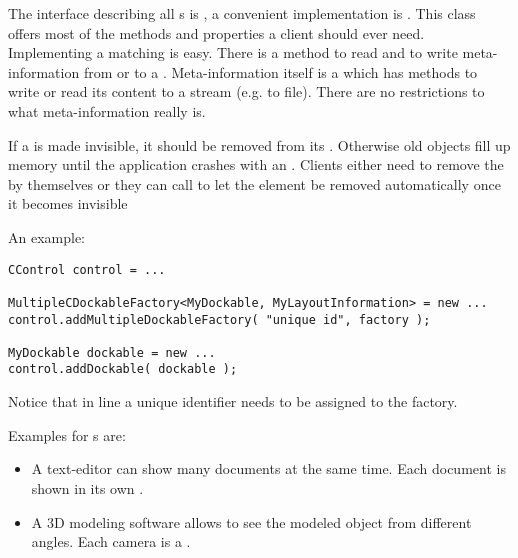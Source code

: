 The interface describing all s is , a convenient implementation is . This class offers most of the methods and properties a client should ever need.
Implementing a matching  is easy. There is a method to read and to write meta-information from or to a . Meta-information itself is a  which has methods to write or read its content to a stream (e.g. to file). There are no restrictions to what meta-information really is.

If a  is made invisible, it should be removed from its \linebreak {}. Otherwise old objects fill up memory until the application crashes with an . Clients either need to remove the  by themselves or they can call  to let the element be removed automatically once it becomes invisible



An example:
\begin{lstlisting}
CControl control = ...

MultipleCDockableFactory<MyDockable, MyLayoutInformation> = new ...
control.addMultipleDockableFactory( "unique id", factory );

MyDockable dockable = new ...
control.addDockable( dockable );
\end{lstlisting}
Notice that in line  a unique identifier needs to be assigned to the factory.


Examples for s are:
\begin{itemize}
 \item A text-editor can show many documents at the same time. Each document is shown in its own .
 \item A 3D modeling software allows to see the modeled object from different angles. Each camera is a .
\end{itemize}

